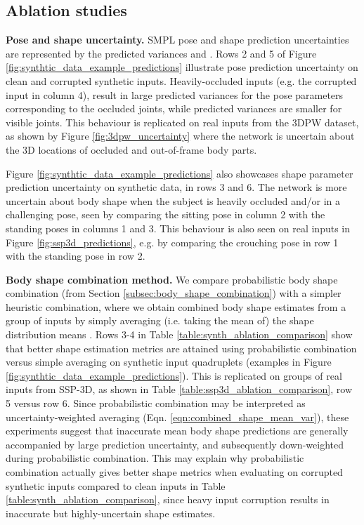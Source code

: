 \documentclass[final]{cvpr}
\begin{document}
\subsection{Ablation studies}

\noindent \textbf{Pose and shape uncertainty.} SMPL pose and shape prediction uncertainties are represented by the predicted variances  and . Rows 2 and 5 of Figure \ref{fig:synthtic_data_example_predictions} illustrate pose prediction uncertainty on clean and corrupted synthetic inputs. Heavily-occluded inputs (e.g. the corrupted input in column 4), result in large predicted variances for the pose parameters corresponding to the occluded joints, while predicted variances are smaller for visible joints. This behaviour is replicated on real inputs from the 3DPW dataset, as shown by Figure \ref{fig:3dpw_uncertainty} where the network is uncertain about the 3D locations of occluded and out-of-frame body parts.

Figure \ref{fig:synthtic_data_example_predictions} also showcases shape parameter prediction uncertainty on synthetic data, in rows 3 and 6. The network is more uncertain about body shape when the subject is heavily occluded and/or in a challenging pose, seen by comparing the sitting pose in column 2 with the standing poses in columns 1 and 3. This behaviour is also seen on real inputs in Figure \ref{fig:ssp3d_predictions}, e.g. by comparing the crouching pose in row 1 with the standing pose in row 2.

\noindent \textbf{Body shape combination method.} We compare probabilistic body shape combination (from Section \ref{subsec:body_shape_combination}) with a simpler heuristic combination, where we obtain combined body shape estimates from a group of inputs  by simply averaging (i.e. taking the mean of) the shape distribution means . Rows 3-4 in Table \ref{table:synth_ablation_comparison} show that better shape estimation metrics are attained using probabilistic combination versus simple averaging on synthetic input quadruplets (examples in Figure \ref{fig:synthtic_data_example_predictions}). This is replicated on groups of real inputs from SSP-3D, as shown in Table \ref{table:ssp3d_ablation_comparison}, row 5 versus row 6. Since probabilistic combination may be interpreted as uncertainty-weighted averaging (Eqn. \ref{eqn:combined_shape_mean_var}), these experiments suggest that inaccurate mean body shape predictions are generally accompanied by large prediction uncertainty, and subsequently down-weighted during probabilistic combination. This may explain why probabilistic combination actually gives better shape metrics when evaluating on corrupted synthetic inputs compared to clean inputs in Table \ref{table:synth_ablation_comparison}, since heavy input corruption results in inaccurate but highly-uncertain shape estimates.
\end{document}
